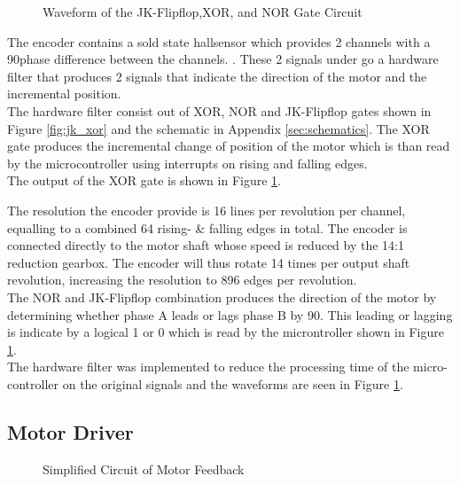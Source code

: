 \begin{figure}[h]
	\centering
	
	\caption{Waveform of the JK-Flipflop,XOR, and NOR Gate Circuit}
	\label{fig:jk_xor_waveform}
\end{figure}

The encoder contains a sold state hallsensor which provides 2 channels with a 90\textdegree \space phase difference between the channels. \citep{faulhaberencoder}. These 2 signals under go a hardware filter that produces 2 signals that indicate the direction of the motor and the incremental position.\\

The hardware filter consist out of XOR, NOR and JK-Flipflop gates shown in Figure \ref{fig:jk_xor} and the schematic in Appendix \ref{sec:schematics}. The XOR gate produces the incremental change of position of the motor which is than read by the microcontroller using interrupts on rising and falling edges.\\ The output of the XOR gate is shown in Figure \ref{fig:jk_xor_waveform}.

The resolution the encoder provide is 16 lines per revolution per channel, equalling to a combined 64 rising- \& falling edges in total. The encoder is connected directly to the motor shaft whose speed is reduced by the 14:1 reduction gearbox. The encoder will thus rotate 14 times per output shaft revolution, increasing the resolution to 896 edges per revolution.\\

 The NOR and JK-Flipflop combination produces the direction of the motor by determining whether phase A leads or lags phase B by 90\textdegree. This leading or lagging is indicate by a logical 1 or 0 which is read by the microntroller shown in Figure \ref{fig:jk_xor_waveform}.\\
 
 The hardware filter was implemented to reduce the processing time of the micro-controller on the original signals and the waveforms are seen in Figure \ref{fig:jk_xor_waveform}.



\subsection{Motor Driver}
\begin{figure}[h]
	\centering
	
	\caption{Simplified Circuit of Motor Feedback}
	\label{fig:feedback_current}
\end{figure}


